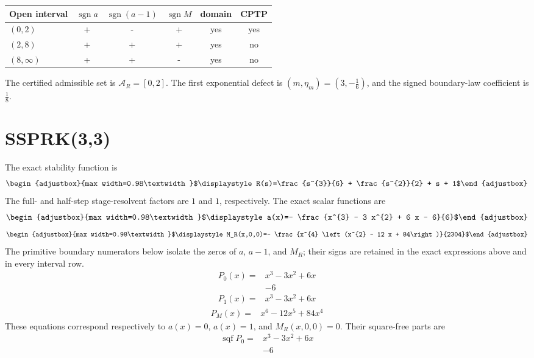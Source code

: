 \begin{center}
\begin{tabular}{@{}l c c c c c@{}}
\toprule
Open interval & $\operatorname{sgn}a$ & $\operatorname{sgn}(a-1)$ & $\operatorname{sgn}M$ & domain & CPTP \\
\midrule
$(0,2)$ & + & - & + & yes & yes \\
$(2,8)$ & + & + & + & yes & no \\
$(8,\infty)$ & + & + & - & yes & no \\
\bottomrule
\end{tabular}
\end{center}
The certified admissible set is $\mathcal A_R=[0,2]$. The first exponential defect is $(m,\eta_m)=(3,- \frac{1}{6})$, and the signed boundary-law coefficient is $\frac{1}{8}$.
\section{SSPRK(3,3)}
The exact stability function is
\[\begin{adjustbox}{max width=0.98\textwidth}$\displaystyle R(s)=\frac{s^{3}}{6} + \frac{s^{2}}{2} + s + 1$\end{adjustbox}\]
The full- and half-step stage-resolvent factors are $1$ and $1$, respectively.
The exact scalar functions are
\[\begin{adjustbox}{max width=0.98\textwidth}$\displaystyle a(x)=- \frac{x^{3} - 3 x^{2} + 6 x - 6}{6}$\end{adjustbox}\]
\[\begin{adjustbox}{max width=0.98\textwidth}$\displaystyle M_R(x,0,0)=- \frac{x^{4} \left(x^{2} - 12 x + 84\right)}{2304}$\end{adjustbox}\]
The primitive boundary numerators below isolate the zeros of $a$, $a-1$, and $M_R$; their signs are retained in the exact expressions above and in every interval row.
\[\begin{aligned}
P_0(x)={}&x^{3}-3 x^{2}+6 x\\
&-6
\end{aligned}\]
\[\begin{aligned}
P_1(x)={}&x^{3}-3 x^{2}+6 x
\end{aligned}\]
\[\begin{aligned}
P_M(x)={}&x^{6}-12 x^{5}+84 x^{4}
\end{aligned}\]
These equations correspond respectively to $a(x)=0$, $a(x)=1$, and $M_R(x,0,0)=0$. Their square-free parts are
\[\begin{aligned}
\operatorname{sqf}P_0={}&x^{3}-3 x^{2}+6 x\\
&-6
\end{aligned}\]
